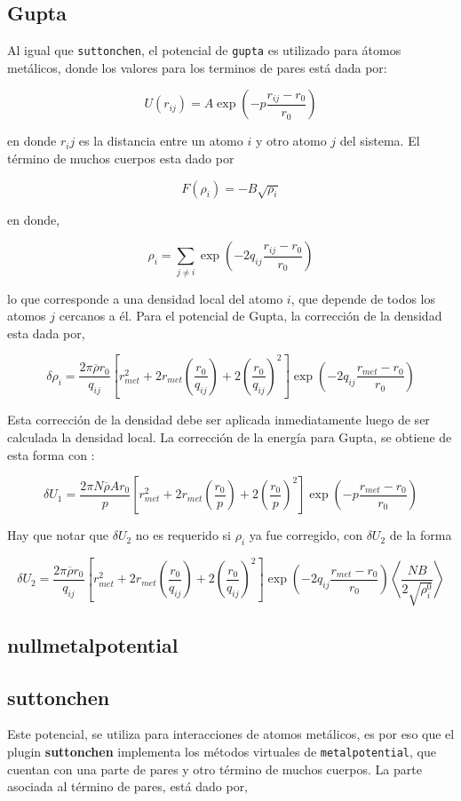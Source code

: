 \subsection{Gupta}

Al igual que \verb|suttonchen|, el potencial de \verb|gupta| es utilizado para \'atomos met\'alicos, donde los valores para los terminos de pares est\'a dada por:

$$U(r_{ij}) = A\exp{\left(-p\frac{r_{ij}-r_0}{r_0}\right)}$$

en donde $r_ij$ es la distancia entre un atomo $i$ y otro atomo $j$ del sistema. El t\'ermino de muchos cuerpos esta dado por

$$F(\rho_{i}) = -B\sqrt{\rho_i}$$

en donde,

$$\rho_i = \sum_{j\neq i} \exp{\left(-2q_{ij}\frac{r_{ij}-r_0}{r_0}\right)}$$

lo que corresponde a una densidad local del atomo $i$, que depende de todos los atomos $j$ cercanos a \'el. Para el potencial de Gupta, la correcci\'on de la densidad esta dada por,

$$\delta\rho_i=\frac{2\pi\overline{\rho}r_0}{q_{ij}}\left[r^2_{met}+2r_{met}\left(\frac{r_0}{q_{ij}}\right)+2\left(\frac{r_0}{q_{ij}}\right)^2\right]\exp{\left(-2q_{ij}\frac{r_{met}-r_0}{r_0}\right)}$$

Esta correcci\'on de la densidad debe ser aplicada inmediatamente luego de ser calculada la densidad local. La correcci\'on de la energ\'ia para Gupta, se obtiene de esta forma con :

$$\delta U_1 = \frac{2\pi N\overline{\rho}A r_0}{p}\left[r^2_{met}+2r_{met}\left(\frac{r_0}{p}\right)+2\left(\frac{r_0}{p}\right)^2\right]\exp{\left(-p\frac{r_{met}-r_0}{r_0}\right)}$$

Hay que notar que $\delta U_2$ no es requerido si $\rho_i$ ya fue corregido, con $\delta U_2$ de la forma

$$\delta U_2 = \frac{2\pi\overline{\rho} r_0}{q_{ij}}\left[r^2_{met}+2r_{met}\left(\frac{r_0}{q_{ij}}\right)+2\left(\frac{r_0}{q_{ij}}\right)^2\right]\exp{\left(-2q_{ij}\frac{r_{met}-r_0}{r_0}\right)}\left<\frac{NB}{2\sqrt{\rho_i^0}}\right>$$

\subsection{nullmetalpotential}

\subsection{suttonchen}
Este potencial, se utiliza para interacciones de atomos met\'alicos, es por eso que el plugin \textbf{suttonchen} implementa los m\'etodos virtuales de \verb|metalpotential|, que cuentan con una parte de pares y otro t\'ermino de muchos cuerpos. La parte asociada al t\'ermino de pares, est\'a dado por,

